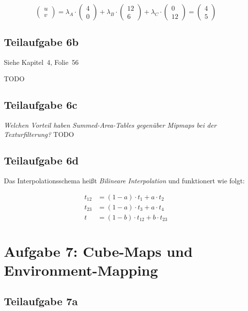 \documentclass[a4paper]{scrartcl}
\begin{document}
\begin{equation}
\begin{pmatrix}u\\v\end{pmatrix} = \lambda_A \cdot \begin{pmatrix}4\\0\end{pmatrix} + \lambda_B \cdot \begin{pmatrix}12\\6\end{pmatrix} + \lambda_C \cdot \begin{pmatrix}0\\12\end{pmatrix} = \begin{pmatrix}4\\5\end{pmatrix}
\end{equation}


\subsection*{Teilaufgabe 6b}
Siehe Kapitel~4, Folie~56

TODO


\subsection*{Teilaufgabe 6c}
\textit{Welchen Vorteil haben Summed-Area-Tables gegenüber Mipmaps bei der Texturfilterung?}
TODO

\subsection*{Teilaufgabe 6d}
Das Interpolationsschema heißt \textit{Bilineare Interpolation} und funktionert
wie folgt:

\begin{align}
    t_{12} &= (1-a) \cdot t_1 + a \cdot t_2\\
    t_{23} &= (1-a) \cdot t_3 + a \cdot t_4\\
    t      &= (1-b) \cdot t_{12} + b \cdot t_{23}
\end{align}

\section*{Aufgabe 7: Cube-Maps und Environment-Mapping}
\subsection*{Teilaufgabe 7a}
\end{document}
